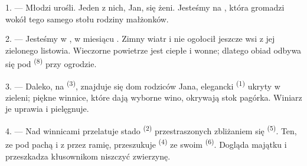 %
%

\VUsaut{4.0mm}
\VUsaut{1.6mm}
\VUsaut{3.2mm}

\VUsaut{1.6mm}
\VUsaut{2.6mm}

\VUsaut{3.0mm}

1. --- Młodzi urośli. Jeden z nich, Jan, się żeni. Jesteśmy na , która gromadzi wokół tego samego stołu rodziny małżonków.

2. --- Jesteśmy w , w miesiącu . Zimny wiatr
 i  nie ogołocił jeszcze wsi z jej zielonego
listowia. Wieczorne powietrze jest ciepłe i wonne; dlatego obiad odbywa się pod
 \textsuperscript{(8)} przy ogrodzie.

3. --- Daleko, na  \textsuperscript{(3)}, znajduje się dom rodziców
Jana, elegancki  \textsuperscript{(1)} ukryty w zieleni; piękne winnice,
które dają wyborne wino, okrywają stok pagórka. Winiarz je uprawia i pielęgnuje.

4. --- Nad winnicami przelatuje stado  \textsuperscript{(2)}
przestraszonych zbliżaniem się  \textsuperscript{(5)}. Ten, ze
 pod pachą i z  przez ramię, przeszukuje
 \textsuperscript{(4)} ze swoim  \textsuperscript{(6)}.
Dogląda majątku i przeszkadza kłusownikom niszczyć zwierzynę.

